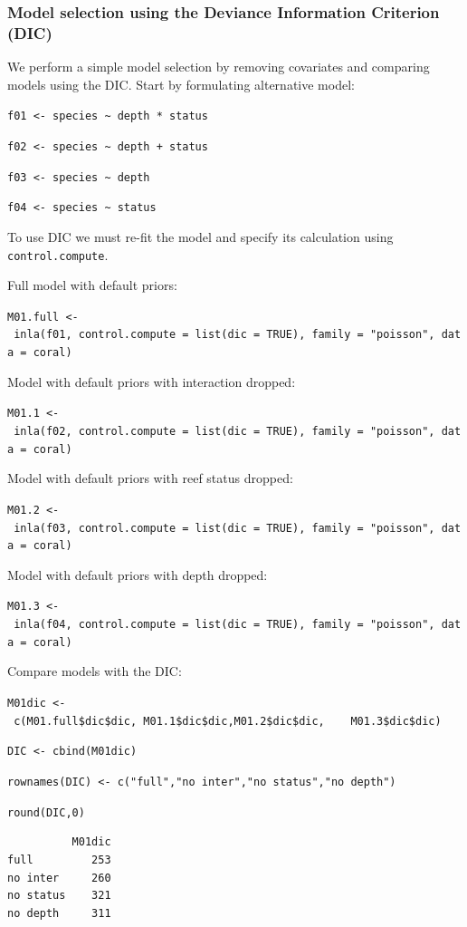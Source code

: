 \documentclass[
]{book}
\begin{document}
\hypertarget{nb-dic}{%
\subsubsection{Model selection using the Deviance Information Criterion (DIC)}\label{nb-dic}}

We perform a simple model selection by removing covariates and comparing models using the DIC. Start by formulating alternative model:

\texttt{f01\ \textless{}-\ species\ \textasciitilde{}\ depth\ *\ status}

\texttt{f02\ \textless{}-\ species\ \textasciitilde{}\ depth\ +\ status}

\texttt{f03\ \textless{}-\ species\ \textasciitilde{}\ depth}

\texttt{f04\ \textless{}-\ species\ \textasciitilde{}\ status}

To use DIC we must re-fit the model and specify its calculation using \texttt{control.compute}.

Full model with default priors:

\texttt{M01.full\ \textless{}-\ inla(f01,\ control.compute\ =\ list(dic\ =\ TRUE),\ family\ =\ "poisson",\ data\ =\ coral)}

Model with default priors with interaction dropped:

\texttt{M01.1\ \textless{}-\ inla(f02,\ control.compute\ =\ list(dic\ =\ TRUE),\ family\ =\ "poisson",\ data\ =\ coral)}

Model with default priors with reef status dropped:

\texttt{M01.2\ \textless{}-\ inla(f03,\ control.compute\ =\ list(dic\ =\ TRUE),\ family\ =\ "poisson",\ data\ =\ coral)}

Model with default priors with depth dropped:

\texttt{M01.3\ \textless{}-\ inla(f04,\ control.compute\ =\ list(dic\ =\ TRUE),\ family\ =\ "poisson",\ data\ =\ coral)}

Compare models with the DIC:

\texttt{M01dic\ \textless{}-\ c(M01.full\$dic\$dic,\ M01.1\$dic\$dic,M01.2\$dic\$dic,\ \ \ \ M01.3\$dic\$dic)}

\texttt{DIC\ \textless{}-\ cbind(M01dic)}

\texttt{rownames(DIC)\ \textless{}-\ c("full","no\ inter","no\ status","no\ depth")}

\texttt{round(DIC,0)}

\begin{verbatim}
          M01dic
full         253
no inter     260
no status    321
no depth     311
\end{verbatim}
\end{document}
